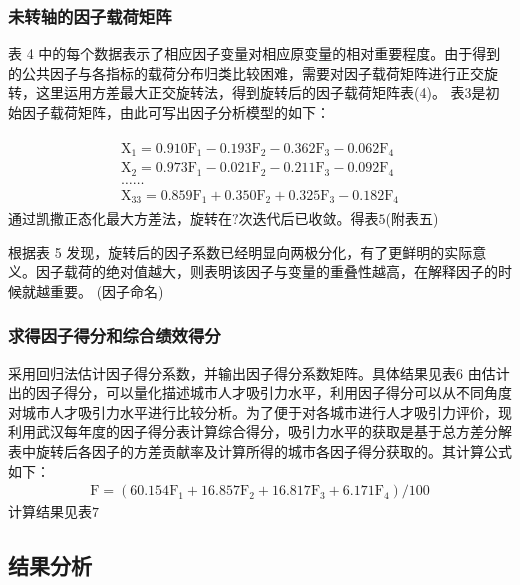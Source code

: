 \documentclass{whutmod}
\begin{document}
	\subsubsection{未转轴的因子载荷矩阵}
	表 4 中的每个数据表示了相应因子变量对相应原变量的相对重要程度。由于得到的公共因子与各指标的载荷分布归类比较困难，需要对因子载荷矩阵进行正交旋转，这里运用方差最大正交旋转法，得到旋转后的因子载荷矩阵表(4)。
	表$3$是初始因子载荷矩阵，由此可写出因子分析模型的如下：
	
	\begin{gather}
	\begin{array} { l } { \mathrm { X } _ { 1 } = 0.910 \mathrm { F } _ { 1 } - 0.193 \mathrm { F } _ { 2 } - 0.362 \mathrm { F } _ { 3 } - 0.062 \mathrm { F } _ { 4 } } \\ { \mathrm { X } _ { 2 } = 0.973 \mathrm { F } _ { 1 } - 0.021 \mathrm { F } _ { 2 } - 0.211 \mathrm { F } _ { 3 } - 0.092 \mathrm { F } _ { 4 } } \\ { \ldots \ldots } \\ { \mathrm { X } _ { 33 } = 0.859 \mathrm { F } _ { 1 } + 0.350 \mathrm { F } _ { 2 } + 0.325 \mathrm { F } _ { 3 } - 0.182 \mathrm { F } _ { 4 } } \end{array}
	\end{gather}
	通过凯撒正态化最大方差法，旋转在$?$次迭代后已收敛。得表$5$(附表五)
	
	根据表 5 发现，旋转后的因子系数已经明显向两极分化，有了更鲜明的实际意义。因子载荷的绝对值越大，则表明该因子与变量的重叠性越高，在解释因子的时候就越重要。
	(因子命名)
	\subsubsection{求得因子得分和综合绩效得分}
	采用回归法估计因子得分系数，并输出因子得分系数矩阵。具体结果见表$6$
	由估计出的因子得分，可以量化描述城市人才吸引力水平，利用因子得分可以从不同角度对城市人才吸引力水平进行比较分析。为了便于对各城市进行人才吸引力评价，现利用武汉每年度的因子得分表计算综合得分，吸引力水平的获取是基于总方差分解表中旋转后各因子的方差贡献率及计算所得的城市各因子得分获取的。其计算公式如下：
	\begin{gather}
	\mathrm { F } = \left( 60.154 \mathrm { F } _ { 1 } + 16.857 \mathrm { F } _ { 2 } + 16.817 \mathrm { F } _ { 3 } + 6.171 \mathrm { F } _ { 4 } \right) / 100
	\end{gather}
	计算结果见表$7$
	\subsection{结果分析}
\end{document}
